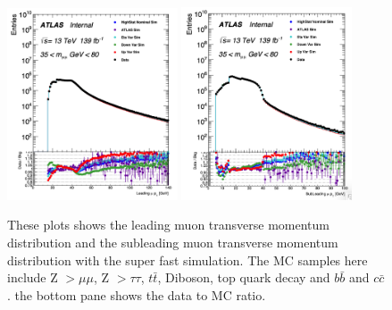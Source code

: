 \begin{figure}[!htb]
    \begin{center}
        \includegraphics[width=0.45\textwidth]{figures/chapter_dimuon/superfast_leadingMuonPT}
        \includegraphics[width=0.45\textwidth]{figures/chapter_dimuon/superfast_subleadingMuonPT}
        \caption{
        These plots shows the leading muon transverse momentum distribution and the subleading muon transverse momentum distribution with the super fast simulation.  The MC samples here include Z $> \mu\mu$, Z $> \tau\tau$, $ t \bar{t}$, Diboson, top quark decay and $b\bar{b}$ and $c\bar{c}$. the bottom pane shows the data to MC ratio. }
    \end{center}
\label{fig:datamc}
\end{figure}
\FloatBarrier






